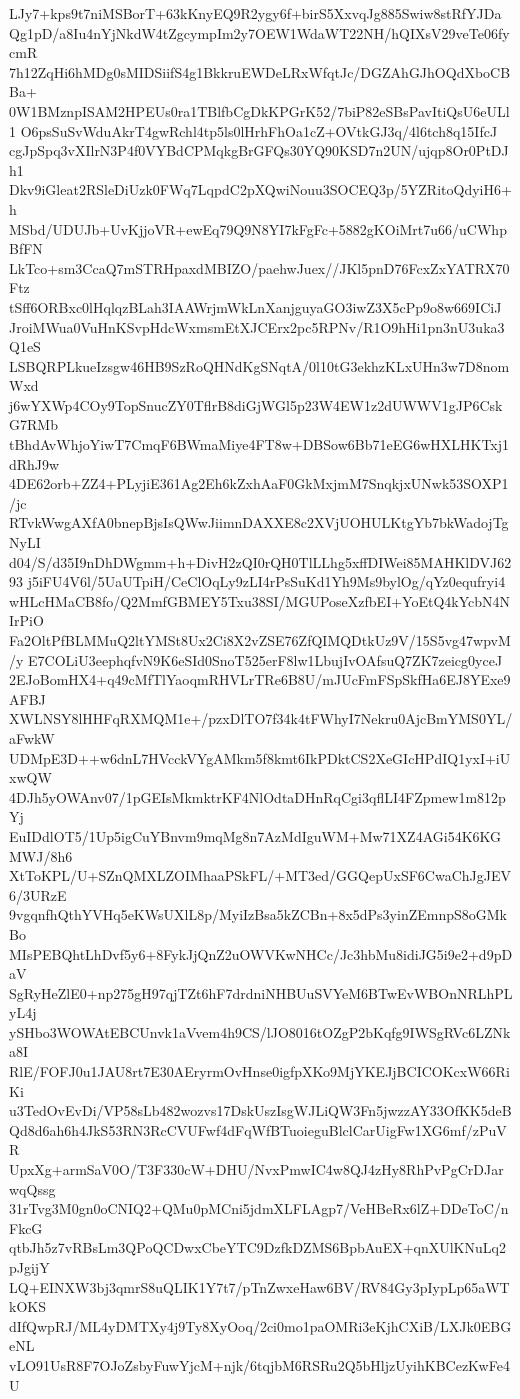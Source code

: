 LJy7+kps9t7niMSBorT+63kKnyEQ9R2ygy6f+birS5XxvqJg885Swiw8stRfYJDa
Qg1pD/a8Iu4nYjNkdW4tZgcympIm2y7OEW1WdaWT22NH/hQIXsV29veTe06fycmR
7h12ZqHi6hMDg0sMIDSiifS4g1BkkruEWDeLRxWfqtJc/DGZAhGJhOQdXboCBBa+
0W1BMznpISAM2HPEUs0ra1TBlfbCgDkKPGrK52/7biP82eSBsPavItiQsU6eULl1
O6psSuSvWduAkrT4gwRchl4tp5ls0lHrhFhOa1cZ+OVtkGJ3q/4l6tch8q15IfcJ
cgJpSpq3vXIlrN3P4f0VYBdCPMqkgBrGFQs30YQ90KSD7n2UN/ujqp8Or0PtDJh1
Dkv9iGleat2RSleDiUzk0FWq7LqpdC2pXQwiNouu3SOCEQ3p/5YZRitoQdyiH6+h
MSbd/UDUJb+UvKjjoVR+ewEq79Q9N8YI7kFgFc+5882gKOiMrt7u66/uCWhpBfFN
LkTco+sm3CcaQ7mSTRHpaxdMBIZO/paehwJuex//JKl5pnD76FcxZxYATRX70Ftz
tSff6ORBxc0lHqlqzBLah3IAAWrjmWkLnXanjguyaGO3iwZ3X5cPp9o8w669ICiJ
JroiMWua0VuHnKSvpHdcWxmsmEtXJCErx2pc5RPNv/R1O9hHi1pn3nU3uka3Q1eS
LSBQRPLkueIzsgw46HB9SzRoQHNdKgSNqtA/0l10tG3ekhzKLxUHn3w7D8nomWxd
j6wYXWp4COy9TopSnucZY0TflrB8diGjWGl5p23W4EW1z2dUWWV1gJP6CskG7RMb
tBhdAvWhjoYiwT7CmqF6BWmaMiye4FT8w+DBSow6Bb71eEG6wHXLHKTxj1dRhJ9w
4DE62orb+ZZ4+PLyjiE361Ag2Eh6kZxhAaF0GkMxjmM7SnqkjxUNwk53SOXP1/jc
RTvkWwgAXfA0bnepBjsIsQWwJiimnDAXXE8c2XVjUOHULKtgYb7bkWadojTgNyLI
d04/S/d35I9nDhDWgmm+h+DivH2zQI0rQH0TlLLhg5xffDIWei85MAHKlDVJ6293
j5iFU4V6l/5UaUTpiH/CeClOqLy9zLI4rPsSuKd1Yh9Ms9bylOg/qYz0equfryi4
wHLcHMaCB8fo/Q2MmfGBMEY5Txu38SI/MGUPoseXzfbEI+YoEtQ4kYcbN4NIrPiO
Fa2OltPfBLMMuQ2ltYMSt8Ux2Ci8X2vZSE76ZfQIMQDtkUz9V/15S5vg47wpvM/y
E7COLiU3eephqfvN9K6eSId0SnoT525erF8lw1LbujIvOAfsuQ7ZK7zeicg0yceJ
2EJoBomHX4+q49cMfTlYaoqmRHVLrTRe6B8U/mJUcFmFSpSkfHa6EJ8YExe9AFBJ
XWLNSY8lHHFqRXMQM1e+/pzxDlTO7f34k4tFWhyI7Nekru0AjcBmYMS0YL/aFwkW
UDMpE3D++w6dnL7HVcckVYgAMkm5f8kmt6IkPDktCS2XeGIcHPdIQ1yxI+iUxwQW
4DJh5yOWAnv07/1pGEIsMkmktrKF4NlOdtaDHnRqCgi3qflLI4FZpmew1m812pYj
EuIDdlOT5/1Up5igCuYBnvm9mqMg8n7AzMdIguWM+Mw71XZ4AGi54K6KGMWJ/8h6
XtToKPL/U+SZnQMXLZOIMhaaPSkFL/+MT3ed/GGQepUxSF6CwaChJgJEV6/3URzE
9vgqnfhQthYVHq5eKWsUXlL8p/MyiIzBsa5kZCBn+8x5dPs3yinZEmnpS8oGMkBo
MIsPEBQhtLhDvf5y6+8FykJjQnZ2uOWVKwNHCc/Jc3hbMu8idiJG5i9e2+d9pDaV
SgRyHeZlE0+np275gH97qjTZt6hF7drdniNHBUuSVYeM6BTwEvWBOnNRLhPLyL4j
ySHbo3WOWAtEBCUnvk1aVvem4h9CS/lJO8016tOZgP2bKqfg9IWSgRVc6LZNka8I
RlE/FOFJ0u1JAU8rt7E30AEryrmOvHnse0igfpXKo9MjYKEJjBCICOKcxW66RiKi
u3TedOvEvDi/VP58sLb482wozvs17DskUszIsgWJLiQW3Fn5jwzzAY33OfKK5deB
Qd8d6ah6h4JkS53RN3RcCVUFwf4dFqWfBTuoieguBlclCarUigFw1XG6mf/zPuVR
UpxXg+armSaV0O/T3F330cW+DHU/NvxPmwIC4w8QJ4zHy8RhPvPgCrDJarwqQssg
31rTvg3M0gn0oCNIQ2+QMu0pMCni5jdmXLFLAgp7/VeHBeRx6lZ+DDeToC/nFkcG
qtbJh5z7vRBsLm3QPoQCDwxCbeYTC9DzfkDZMS6BpbAuEX+qnXUlKNuLq2pJgijY
LQ+EINXW3bj3qmrS8uQLIK1Y7t7/pTnZwxeHaw6BV/RV84Gy3pIypLp65aWTkOKS
dIfQwpRJ/ML4yDMTXy4j9Ty8XyOoq/2ci0mo1paOMRi3eKjhCXiB/LXJk0EBGeNL
vLO91UsR8F7OJoZsbyFuwYjcM+njk/6tqjbM6RSRu2Q5bHljzUyihKBCezKwFe4U
